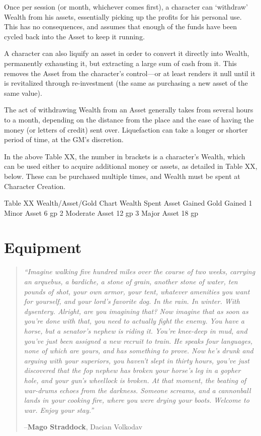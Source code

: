 \documentclass[oneside,11pt,english]{book}
\begin{document}
 

Once per session (or month, whichever comes first), a character can ‘withdraw’ Wealth from his assets, 
essentially picking up the profits for his personal use. This has no consequences, and assumes that enough 
of the funds have been cycled back into the Asset to keep it running. 

 

A character can also liquify an asset in order to convert it directly into Wealth, permanently exhausting it, 
but extracting a large sum of cash from it. This removes the Asset from the character’s control—or at 
least renders it null until it is revitalized through re-investment (the same as purchasing a new asset of the 
same value). 


The act of withdrawing Wealth from an Asset generally takes from several hours to a month, depending 
on the distance from the place and the ease of having the money (or letters of credit) sent over. 
Liquefaction can take a longer or shorter period of time, at the GM’s discretion. 

 

In the above Table XX, the number in brackets is a character’s Wealth, which can be used either to 
acquire additional money or assets, as detailed in Table XX, below. These can be purchased multiple 
times, and Wealth must be spent at Character Creation. 

 
Table XX Wealth/Asset/Gold Chart 
Wealth Spent Asset Gained Gold Gained 
1 Minor Asset 6 gp 
2 Moderate Asset 12 gp 
3 Major Asset 18 gp 

 

\chapter{Equipment}\label{ch:equipment} 
\startcontents[chapters]
\clearpage
\begin{quote}
	\raggedright
	\emph{“Imagine walking five hundred miles over the course of two weeks, carrying an arquebus, a bardiche, a stone of grain, another stone of water, ten pounds of shot, your own armor, your tent, whatever amenities you want for yourself, and your lord’s favorite dog. In the rain. In winter. With dysentery. Alright, are you imagining that? Now imagine that as soon as you’re done with that, you need to actually fight the enemy. You have a horse, but a senator’s nephew is riding it. You’re knee-deep in mud, and you’ve just been assigned a new recruit to train. He speaks four languages, none of which are yours, and has something to prove. Now he’s drunk and arguing with your superiors, you haven’t slept in thirty hours, you’ve just discovered that the fop nephew has broken your horse’s leg in a gopher hole, and your gun’s wheellock is broken. At that moment, the beating of war-drums echoes from the darkness. Someone screams, and a cannonball lands in your cooking fire, where you were drying your boots. Welcome to war. Enjoy your stay.”}

		\hfill--\textbf{Mago Straddock}, Dacian Volkodav
\end{quote}
 
\end{document}
